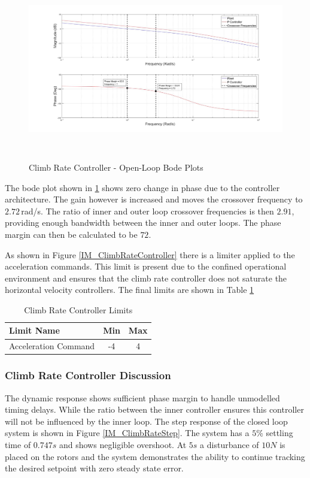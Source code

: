 \documentclass[12pt]{report}
\begin{document}
\begin{figure}[H]
	\centering
	\includegraphics[height = 8cm]{../Design/Matlab/Controllers/climb_rate_bode.jpg}
	\caption{Climb Rate Controller - Open-Loop Bode Plots}
	\label{IM_ClimbRateBode}
\end{figure}

The bode plot shown in \ref{IM_ClimbRateBode} shows zero change in phase due to the controller architecture. The gain however is increased and moves the crossover frequency to $2.72$\,rad/s. The ratio of inner and outer loop crossover frequencies is then $2.91$, providing enough bandwidth between the inner and outer loops. The phase margin can then be calculated to be $72$\textdegree. 

As shown in Figure \ref{IM_ClimbRateController} there is a limiter applied to the acceleration commands. This limit is present due to the confined operational environment and ensures that the climb rate controller does not saturate the horizontal velocity controllers. The final limits are shown in Table \ref{tab:ClimbrateLimits}

\begin{table}[!]
	\centering
	\begin{tabular}{l | c | c |}
		Limit Name 						& Min & Max\\
		\hline\hline
		Acceleration Command 		    & -4 & 4 \\
	\end{tabular}
	\caption{Climb Rate Controller Limits}
	\label{tab:ClimbrateLimits}
\end{table}

\subsubsection{Climb Rate Controller Discussion}
The dynamic response shows sufficient phase margin to handle unmodelled timing delays. While the ratio between the inner controller ensures this controller will not be influenced by the inner loop. The step response of the closed loop system is shown in Figure \ref{IM_ClimbRateStep}. The system has a $5$\% settling time of $0.747s$ and shows negligible overshoot. At $5s$ a disturbance of $10N$ is placed on the rotors and the system demonstrates the ability to continue tracking the desired setpoint with zero steady state error. 
\end{document}
